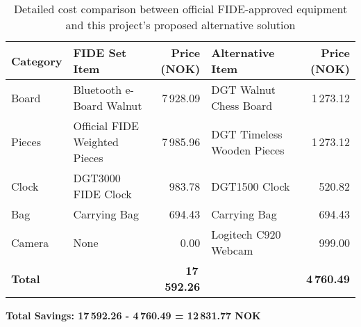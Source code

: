 \begin{table}[h!]
\centering
\caption[Detailed cost comparison]{Detailed cost comparison between official FIDE-approved equipment and this project's proposed alternative solution \cite{dgtshop:prices}}
\label{tab:detailed-price-comparison}
\begin{tabular}{lL{4cm}rL{4cm}r}
\toprule
\textbf{Category} & \textbf{FIDE Set Item} & \textbf{Price (NOK)} & \textbf{Alternative Item} & \textbf{Price (NOK)} \\
\midrule
Board & Bluetooth e-Board Walnut & 7\,928.09 & DGT Walnut Chess Board & 1\,273.12 \\
Pieces & Official FIDE Weighted Pieces & 7\,985.96 & DGT Timeless Wooden Pieces & 1\,273.12 \\
Clock & DGT3000 FIDE Clock & 983.78 & DGT1500 Clock & 520.82 \\
Bag & Carrying Bag & 694.43 & Carrying Bag & 694.43 \\
Camera & None & 0.00 & Logitech C920 Webcam & 999.00 \\
\midrule
\textbf{Total} & & \textbf{17\,592.26} & & \textbf{4\,760.49} \\
\bottomrule
\end{tabular}
\vspace{0.3cm}

\textbf{Total Savings: 17\,592.26 - 4\,760.49 = 12\,831.77 NOK}
\end{table}



